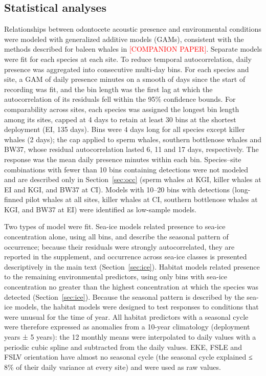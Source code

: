 \documentclass[11pt]{article}
\newcommand{\ins}[1]{\textcolor{red}{[#1]}}
\begin{document}
\subsection{Statistical analyses}\label{sec:stats}
Relationships between odontocete acoustic presence and environmental conditions were modeled with generalized additive models (GAMs), consistent with the methods described for baleen whales in \ins{COMPANION PAPER}. Separate models were fit for each species at each site. To reduce temporal autocorrelation, daily presence was aggregated into consecutive multi-day bins. For each species and site, a GAM of daily presence minutes on a smooth of days since the start of recording was fit, and the bin length was the first lag at which the autocorrelation of its residuals fell within the 95\% confidence bounds. For comparability across sites, each species was assigned the longest bin length among its sites, capped at 4 days to retain at least 30 bins at the shortest deployment (EI, 135 days). Bins were 4 days long for all species except killer whales (2 days); the cap applied to sperm whales, southern bottlenose whales and BW37, whose residual autocorrelation lasted 6, 11 and 17 days, respectively. The response was the mean daily presence minutes within each bin. Species--site combinations with fewer than 10 bins containing detections were not modeled and are described only in Section~\ref{sec:occ} (sperm whales at KGI, killer whales at EI and KGI, and BW37 at CI). Models with 10--20 bins with detections (long-finned pilot whales at all sites, killer whales at CI, southern bottlenose whales at KGI, and BW37 at EI) were identified as low-sample models.

Two types of model were fit. Sea-ice models related presence to sea-ice concentration alone, using all bins, and describe the seasonal pattern of occurrence; because their residuals were strongly autocorrelated, they are reported in the supplement, and occurrence across sea-ice classes is presented descriptively in the main text (Section~\ref{sec:ice}). Habitat models related presence to the remaining environmental predictors, using only bins with sea-ice concentration no greater than the highest concentration at which the species was detected (Section~\ref{sec:ice}). Because the seasonal pattern is described by the sea-ice models, the habitat models were designed to test responses to conditions that were unusual for the time of year. All habitat predictors with a seasonal cycle were therefore expressed as anomalies from a 10-year climatology (deployment years ± 5 years): the 12 monthly means were interpolated to daily values with a periodic cubic spline and subtracted from the daily values. EKE, FSLE and FSLV orientation have almost no seasonal cycle (the seasonal cycle explained ≤ 8\% of their daily variance at every site) and were used as raw values.
\end{document}

